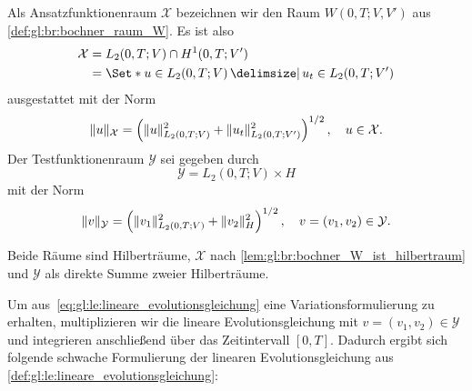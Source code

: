 \begin{Definition}
\label{def:gl:le:ansatz_und_testraum}
    Als Ansatzfunktionenraum $\mathcal X$ bezeichnen wir den Raum $W(0, T; V, V')$ aus \cref{def:gl:br:bochner_raum_W}.
    Es ist also
    \begin{equation}
        \label{eq:gl:le:ansatzraum_X}
        \begin{aligned}
            \mathcal X &= L_{2}(0, T; V) \cap H^{1}(0, T; V')
            \\&= \Set*{ u \in L_{2}(0, T; V) \given u_{t} \in L_{2}(0, T; V') }
        \end{aligned}
    \end{equation}
    ausgestattet mit der Norm
    \begin{equation}
        \label{eq:gl:le:ansatzraum_X_norm}
        \lVert u\rVert_{\mathcal X} = \left( \lVert u\rVert_{L_{2}{(0, T; V)}}^{2} + \lVert u_{t}\rVert_{L_{2}{(0, T; V')}}^{2} \right)^{1 / 2}, \quad u \in \mathcal X.
    \end{equation}
    Der Testfunktionenraum $\mathcal Y$ sei gegeben durch
    \begin{equation}
        \label{eq:gl:le:testraum_Y}
        \mathcal Y = L_{2}(0, T; V) \times H
    \end{equation}
    mit der Norm
    \begin{equation}
        \label{eq:gl:le:testraum_Y_norm}
        \lVert v\rVert_{\mathcal Y} = \left( \lVert v_{1}\rVert_{L_{2}(0, T; V)}^{2} + \lVert v_{2}\rVert_{H}^{2} \right)^{1 / 2}, \quad v = (v_{1}, v_{2}) \in \mathcal Y.
    \end{equation}
\end{Definition}

Beide Räume sind Hilberträume, $\mathcal X$ nach \cref{lem:gl:br:bochner_W_ist_hilbertraum} und $\mathcal Y$ als direkte Summe zweier Hilberträume.

Um aus~\cref{eq:gl:le:lineare_evolutionsgleichung} eine Variationsformulierung zu erhalten, multiplizieren wir die lineare Evolutionsgleichung mit $v = (v_{1}, v_{2}) \in \mathcal Y$ und integrieren anschließend über das Zeitintervall $[0, T]$.
Dadurch ergibt sich folgende schwache Formulierung der linearen Evolutionsgleichung aus \cref{def:gl:le:lineare_evolutionsgleichung}:

